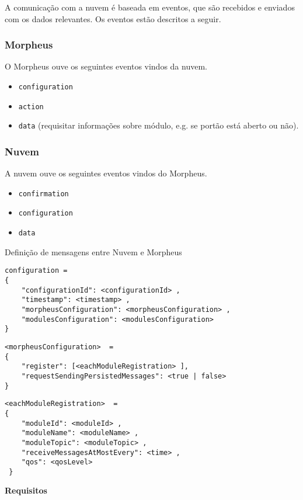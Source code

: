 A comunicação com a nuvem é baseada em eventos, que são recebidos e enviados com os dados relevantes. Os eventos estão descritos a seguir.

\subsubsection{Morpheus}
O Morpheus ouve os seguintes eventos vindos da nuvem.

\begin{itemize}
\item \texttt{configuration}
\item \texttt{action}
\item \texttt{data} (requisitar informações sobre módulo, e.g. se portão está aberto ou não).
\end{itemize}

\subsubsection{Nuvem}
A nuvem ouve os seguintes eventos vindos do Morpheus.

\begin{itemize}
\item \texttt{confirmation}
\item \texttt{configuration}
\item \texttt{data}
\end{itemize}

Definição de mensagens entre Nuvem e Morpheus
\begin{lstlisting}
configuration =
{
    "configurationId": <configurationId> ,
    "timestamp": <timestamp> ,
    "morpheusConfiguration": <morpheusConfiguration> ,
    "modulesConfiguration": <modulesConfiguration>
}
\end{lstlisting}

\begin{lstlisting}
<morpheusConfiguration>  =
{
    "register": [<eachModuleRegistration> ],
    "requestSendingPersistedMessages": <true | false>
}
\end{lstlisting}

\begin{lstlisting}
<eachModuleRegistration>  =
{
    "moduleId": <moduleId> ,
    "moduleName": <moduleName> ,
    "moduleTopic": <moduleTopic> ,
    "receiveMessagesAtMostEvery": <time> ,
    "qos": <qosLevel>
 }
 \end{lstlisting}


\textbf{Requisitos}

